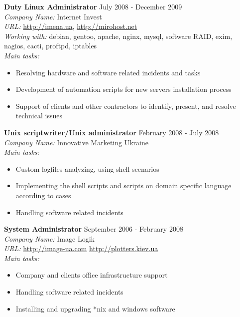 \documentclass[mymargin,10pt]{res} %
\begin{document}
\begin{resume}
{\bf Duty Linux Administrator} \hfill July 2008 - December 2009 \\
{\sl Company Name:} Internet Invest \\
{\sl URL:} \url{http://imena.ua}, \url{http://mirohost.net}\\
{\sl Working with:} debian, gentoo, apache, nginx, mysql, software RAID, exim, nagios, cacti, proftpd,
iptables \\
{\sl Main tasks:}
\begin{itemize}
\item Resolving hardware and software related incidents and tasks
\item Development of automation scripts for new servers installation process
\item Support of clients and other contractors to identify, present, and resolve technical issues
\end{itemize}

{\bf Unix scriptwriter/Unix administrator} \hfill February 2008 - July 2008 \\
{\sl Company Name:} Innovative Marketing Ukraine \\
{\sl Main tasks:}
\begin{itemize}
\item Custom logfiles analyzing, using shell scenarios
\item Implementing the shell scripts and scripts on domain specific language according to cases
\item Handling software related incidents
\end{itemize}

{\bf System Administrator} \hfill September 2006 - February 2008 \\
{\sl Company Name:} Image Logik \\
{\sl URL:} \url{http://image-ua.com} \url{http://plotters.kiev.ua} \\
{\sl Main tasks:}
\begin{itemize}
\item Company and clients office infrastructure support
\item Handling software related incidents
\item Installing and upgrading *nix and windows software
\end{itemize}



\end{resume}
\end{document}
